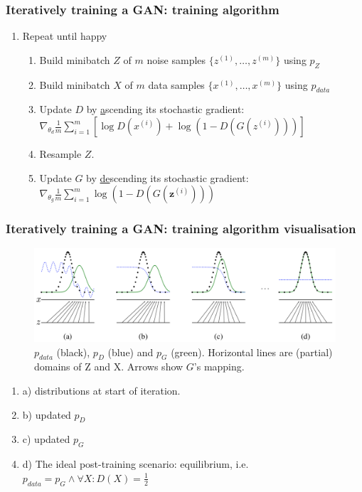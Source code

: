 \documentclass[xcolor=dvipsnames]{beamer}
\begin{document}
\begin{frame}
\frametitle{Iteratively training a GAN\cite{goodfellow2014generative}: training algorithm}

\begin{enumerate}
	\item Repeat until happy
	\begin{enumerate}
		\item Build minibatch $Z$ of $m$ noise samples $\{z^{(1)}, \ldots, z^{(m)}\}$ using $p_Z$
		\item Build minibatch $X$ of $m$ data samples $\{x^{(1)}, \ldots, x^{(m)}\}$ using $p_{data}$
		\item Update $D$ by \underline{a}scending its stochastic gradient:
		$\nabla _ { \theta _ { d } } \frac { 1 } { m } \sum _ { i = 1 } ^ { m } \left[ \log D( x ^ { ( i ) } ) + \log \left( 1 - D \left( G \left( z ^ { ( i ) } \right) \right) \right) \right]$
		\item Resample $Z$.
		\item Update $G$ by \underline{de}scending its stochastic gradient:
		$\nabla _ { \theta _ { g } } \frac { 1 } { m } \sum _ { i = 1 } ^ { m } \log \left( 1 - D \left( G \left( \boldsymbol { z } ^ { ( i ) } \right) \right) \right)$	
	\end{enumerate}
\end{enumerate}

\end{frame}



\begin{frame}
\frametitle{Iteratively training a GAN\cite{goodfellow2014generative}: training algorithm visualisation}
\begin{figure}
\center
\includegraphics[width=\linewidth]{img/gan_training}
\caption{$p_{data}$ (black), $p_D$ (blue) and $p_G$ (green). Horizontal lines are (partial) domains of Z and X. Arrows show $G$'s mapping.}
\end{figure}
\pause
\begin{enumerate}[]
	\item a) distributions at start of iteration.
	\item b) updated $p_D$
	\item c) updated $p_G$
	\item d) The ideal post-training scenario: equilibrium, i.e. $p_{data} = p_{G} \land \forall X : D(X) = \frac{1}{2}$
\end{enumerate}
\end{frame}
\end{document}
